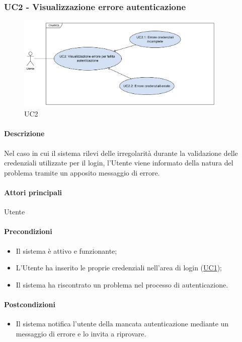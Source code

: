 \subsubsection{UC2 - Visualizzazione errore autenticazione}\label{UC2}

\begin{figure}[H]
  \centering
  \includegraphics[width=0.90\textwidth]{assets/uc2.png}
  \caption{UC2}
\end{figure}

\paragraph*{Descrizione}
Nel caso in cui il sistema rilevi delle irregolarità durante la validazione delle credenziali utilizzate per il login, l'Utente viene informato della natura del problema tramite un apposito messaggio di errore.

\paragraph*{Attori principali}
Utente

\paragraph*{Precondizioni}
\begin{itemize}
  \item Il sistema è attivo e funzionante;
  \item L'Utente ha inserito le proprie credenziali nell'area di login (\hyperref[UC1]{UC1});
  \item Il sistema ha riscontrato un problema nel processo di autenticazione.  
\end{itemize}

\paragraph*{Postcondizioni}
\begin{itemize}
  \item Il sistema notifica l'utente della mancata autenticazione mediante un messaggio di errore e lo invita a riprovare.
\end{itemize}

